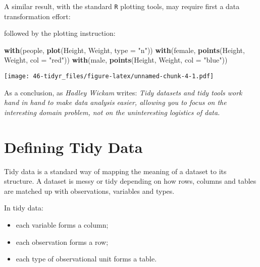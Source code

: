 \documentclass[]{book}
\newenvironment{Shaded}{\begin{snugshade}}{\end{snugshade}}
\newcommand{\KeywordTok}[1]{\textcolor[rgb]{0.13,0.29,0.53}{\textbf{{#1}}}}
\newcommand{\DataTypeTok}[1]{\textcolor[rgb]{0.13,0.29,0.53}{{#1}}}
\newcommand{\StringTok}[1]{\textcolor[rgb]{0.31,0.60,0.02}{{#1}}}
\newcommand{\NormalTok}[1]{{#1}}
\providecommand{\tightlist}{%
  \setlength{\itemsep}{0pt}\setlength{\parskip}{0pt}}
\def\tightlist{}
\begin{document}
A similar result, with the standard \texttt{R} plotting tools, may
require first a data transformation effort:

\begin{Shaded}
\end{Shaded}

followed by the plotting instruction:

\begin{Shaded}
\begin{Highlighting}[]
\KeywordTok{with}\NormalTok{(people, }\KeywordTok{plot}\NormalTok{(Height, Weight, }\DataTypeTok{type =} \StringTok{"n"}\NormalTok{))}
\KeywordTok{with}\NormalTok{(female, }\KeywordTok{points}\NormalTok{(Height, Weight, }\DataTypeTok{col =} \StringTok{"red"}\NormalTok{))}
\KeywordTok{with}\NormalTok{(male, }\KeywordTok{points}\NormalTok{(Height, Weight, }\DataTypeTok{col =} \StringTok{"blue"}\NormalTok{))    }
\end{Highlighting}
\end{Shaded}

\texttt{[image: 46-tidyr\_files/figure-latex/unnamed-chunk-4-1.pdf]}

As a conclusion, as \emph{Hadley Wickam} writes: \emph{Tidy datasets and
tidy tools work hand in hand to make data analysis easier, allowing you
to focus on the interesting domain problem, not on the uninteresting
logistics of data.}

\section{Defining Tidy Data}\label{defining-tidy-data}

Tidy data is a standard way of mapping the meaning of a dataset to its
structure. A dataset is messy or tidy depending on how rows, columns and
tables are matched up with observations, variables and types.

In tidy data:

\begin{itemize}
\tightlist
\item
  each variable forms a column;
\item
  each observation forms a row;
\item
  each type of observational unit forms a table.
\end{itemize}
\end{document}
